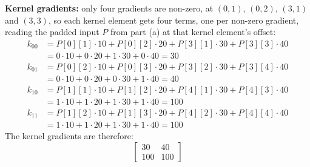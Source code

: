 \textbf{Kernel gradients:} only four gradients are non-zero, at $(0, 1)$, $(0, 2)$, $(3, 1)$ and
$(3, 3)$, so each kernel element gets four terms, one per non-zero gradient, reading the padded
input $P$ from part (a) at that kernel element's offset:
\begin{align*}
  k_{00} &= P[0][1] \cdot 10 + P[0][2] \cdot 20 + P[3][1] \cdot 30 + P[3][3] \cdot 40 \\
         &= 0 \cdot 10 + 0 \cdot 20 + 1 \cdot 30 + 0 \cdot 40 = 30 \\
  k_{01} &= P[0][2] \cdot 10 + P[0][3] \cdot 20 + P[3][2] \cdot 30 + P[3][4] \cdot 40 \\
         &= 0 \cdot 10 + 0 \cdot 20 + 0 \cdot 30 + 1 \cdot 40 = 40 \\
  k_{10} &= P[1][1] \cdot 10 + P[1][2] \cdot 20 + P[4][1] \cdot 30 + P[4][3] \cdot 40 \\
         &= 1 \cdot 10 + 1 \cdot 20 + 1 \cdot 30 + 1 \cdot 40 = 100 \\
  k_{11} &= P[1][2] \cdot 10 + P[1][3] \cdot 20 + P[4][2] \cdot 30 + P[4][4] \cdot 40 \\
         &= 1 \cdot 10 + 1 \cdot 20 + 1 \cdot 30 + 1 \cdot 40 = 100
\end{align*}
The kernel gradients are therefore:
\[
  \begin{bmatrix} 30 & 40 \\ 100 & 100 \end{bmatrix}
\]

